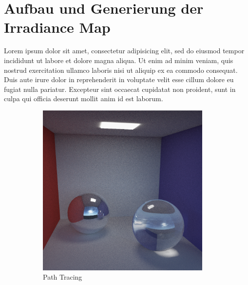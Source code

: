 \section{Aufbau und Generierung der Irradiance Map} %
\label{sec:aufbau_und_generierung_der_irradiance_map}

	Lorem ipsum dolor sit amet, consectetur adipisicing elit, sed do eiusmod
	tempor incididunt ut labore et dolore magna aliqua. Ut enim ad minim veniam,
	quis nostrud exercitation ullamco laboris nisi ut aliquip ex ea commodo
	consequat. Duis aute irure dolor in reprehenderit in voluptate velit esse
	cillum dolore eu fugiat nulla pariatur. Excepteur sint occaecat cupidatat non
	proident, sunt in culpa qui officia deserunt mollit anim id est laborum.

	\begin{figure}[h]
		\begin{subfigure}[b]{0.33\textwidth}
			\center
			\includegraphics[width=0.95\textwidth]{pic/irrmap-cornell-ref.png}
			\caption{Path Tracing}
		\end{subfigure}
		\begin{subfigure}[b]{0.33\textwidth}
			\center

\end{subfigure}
\end{figure}
